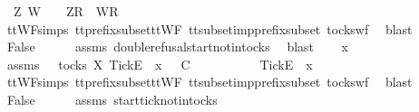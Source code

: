 \begin{isabellebody}
\ {\isasymsigma}{\isacharprime}\ Z\ W\ \ {\isachardoublequoteopen}{\isasymsigma}\ {\isacharequal}\ {\isacharbrackleft}Z{\isacharbrackright}\isactrlsub R\ {\isacharhash}\ {\isacharbrackleft}W{\isacharbrackright}\isactrlsub R\ {\isacharhash}\ {\isasymsigma}{\isacharprime}{\isachardoublequoteclose}\isanewline
\ \ \ \ \isamarkupfalse%
\ ttWF{\isachardot}simps{\isacharparenleft}{}{}{\isacharparenright}\ tt{\isacharunderscore}prefix{\isacharunderscore}subset{\isacharunderscore}ttWF\ tt{\isacharunderscore}subset{\isacharunderscore}imp{\isacharunderscore}prefix{\isacharunderscore}subset\ tocks{\isacharunderscore}wf\ \isamarkupfalse%
\ blast\isanewline
\ \ \isamarkupfalse%
\ \isamarkupfalse%
\ False\isanewline
\ \ \ \ \isamarkupfalse%
\ assms{\isacharparenleft}{}{\isacharparenright}\ double{\isacharunderscore}refusal{\isacharunderscore}start{\isacharunderscore}notin{\isacharunderscore}tocks\ \isamarkupfalse%
\ blast\isanewline
{}\isamarkupfalse%
\isanewline
\ \ \isamarkupfalse%
\ x\ {\isasymrho}\ {\isasymsigma}\isanewline
\ \ \isamarkupfalse%
\ assms{\isacharcolon}\ {\isachardoublequoteopen}{\isasymsigma}\ {\isasymin}\ tocks\ X{\isachardoublequoteclose}\ {\isachardoublequoteopen}{\isacharbrackleft}Tick{\isacharbrackright}\isactrlsub E\ {\isacharhash}\ x\ {\isacharhash}\ {\isasymrho}\ {\isasymsubseteq}\isactrlsub C\ {\isasymsigma}{\isachardoublequoteclose}\isanewline
\ \ \isamarkupfalse%
\ \isamarkupfalse%
\ {\isasymsigma}{\isacharprime}\ \ {\isachardoublequoteopen}{\isasymsigma}\ {\isacharequal}\ {\isacharbrackleft}Tick{\isacharbrackright}\isactrlsub E\ {\isacharhash}\ x\ {\isacharhash}\ {\isasymsigma}{\isacharprime}{\isachardoublequoteclose}\isanewline
\ \ \ \ \isamarkupfalse%
\ ttWF{\isachardot}simps{\isacharparenleft}{}{\isacharparenright}\ tt{\isacharunderscore}prefix{\isacharunderscore}subset{\isacharunderscore}ttWF\ tt{\isacharunderscore}subset{\isacharunderscore}imp{\isacharunderscore}prefix{\isacharunderscore}subset\ tocks{\isacharunderscore}wf\ \isamarkupfalse%
\ blast\isanewline
\ \ \isamarkupfalse%
\ \isamarkupfalse%
\ False\isanewline
\ \ \ \ \isamarkupfalse%
\ assms{\isacharparenleft}{}{\isacharparenright}\ start{\isacharunderscore}tick{\isacharunderscore}notin{\isacharunderscore}tocks\ \isamarkupfalse%

\end{isabellebody}
